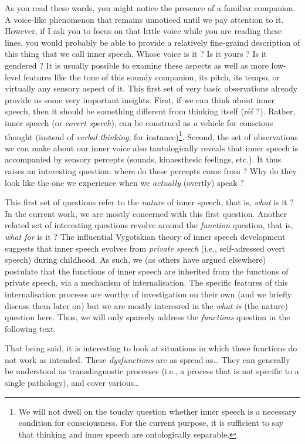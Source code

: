 \documentclass[a4paper,12pt,oneside,oldfontcommands]{memoir}
\let\rmarkdownfootnote\footnote%
\def\footnote{\protect\rmarkdownfootnote}
\newcommand{\initial}[1]{
	\lettrine[lines=3,lhang=0.33,nindent=0em]{
		\color{gray}
     		{\textsc{#1}}}{}}
\begin{document}
\initial{A}s you read these words, you might notice the presence of a
familiar companion. A voice-like phenomenon that remains unnoticed until
we pay attention to it. However, if I ask you to focus on that little
voice while you are reading these lines, you would probably be able to
provide a relatively fine-graind description of this thing that we call
inner speech. Whose voice is it ? Is it yours ? Is it gendered ? It is
usually possible to examine these aspects as well as more low-level
features like the tone of this soundy companion, its pitch, its tempo,
or virtually any sensory aspect of it. This first set of very basic
observations already provide us some very important insights. First, if
we can think about inner speech, then it should be something different
from thinking itself (réf ?). Rather, inner speech (or \emph{covert
speech}), can be construed as \emph{a} vehicle for conscious thought
(instead of \emph{verbal thinking}, for instance)\footnote{We will not
  dwell on the touchy question whether inner speech is a necessary
  condition for consciousness. For the current purpose, it is sufficient
  to say that thinking and inner speech are ontologically separable.}.
Second, the set of observations we can make about our inner voice also
tautologically reveals that inner speech is accompanied by sensory
percepts (sounds, kinaesthesic feelings, etc.). It thus raises an
interesting question: where do these percepts come from ? Why do they
look like the one we experience when we \emph{actually} (overtly) speak
?

This first set of questions refer to the \emph{nature} of inner speech,
that is, \emph{what} is it ? In the current work, we are mostly
concerned with this first question. Another related set of interesting
questions revolve around the \emph{function} question, that is,
\emph{what for} is it ? The influential Vygotskian theory of inner
speech development suggests that inner speech evolves from \emph{private
speech} (i.e., self-adressed overt speech) during childhood. As such, we
(as others have argued elsewhere) postulate that the functions of inner
speech are inherited from the functions of private speech, via a
mechanism of internalisation. The specific features of this
internalisation processs are worthy of investigation on their own (and
we briefly discuss them later on) but we are mostly interesred in the
\emph{what is} (the nature) question here. Thus, we will only sparsely
address the \emph{functions} question in the following text.

That being said, it is interesting to look at situations in which these
functions do not work as intended. These \emph{dysfunctions} \citep[that
can also be considered as
\emph{mis-exadaptation},][]{agnati_possible_2012} are as spread
as\ldots{} They can generally be understood as transdiagnostic processes
(i.e., a process that is not specific to a single pathology), and cover
various\ldots{}
\end{document}
